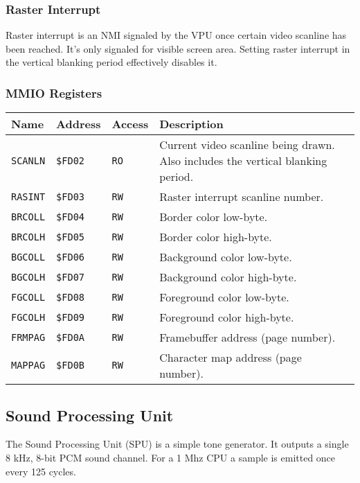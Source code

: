 \documentclass[a4paper,10pt,oneside]{article}
\begin{document}
\subsubsection*{Raster Interrupt}
Raster interrupt is an NMI signaled by the VPU once certain video scanline has been reached. It's only signaled for visible screen area. Setting raster interrupt in the vertical blanking period effectively disables it.

\subsubsection*{MMIO Registers}
\begin{tabularx}{\textwidth}{l | l | l | X }
  \textbf{Name} & \textbf{Address} & \textbf{Access} & \textbf{Description} \\ \hline
  \texttt{SCANLN} & \texttt{\$FD02} & \texttt{RO} &
  Current video scanline being drawn. Also includes the vertical blanking period. \\ \hline
  \texttt{RASINT} & \texttt{\$FD03} & \texttt{RW} &
  Raster interrupt scanline number. \\ \hline
  \texttt{BRCOLL} & \texttt{\$FD04} & \texttt{RW} &
  Border color low-byte. \\ \hline
  \texttt{BRCOLH} & \texttt{\$FD05} & \texttt{RW} &
  Border color high-byte. \\ \hline
  \texttt{BGCOLL} & \texttt{\$FD06} & \texttt{RW} &
  Background color low-byte. \\ \hline
  \texttt{BGCOLH} & \texttt{\$FD07} & \texttt{RW} &
  Background color high-byte. \\ \hline
  \texttt{FGCOLL} & \texttt{\$FD08} & \texttt{RW} &
  Foreground color low-byte. \\ \hline
  \texttt{FGCOLH} & \texttt{\$FD09} & \texttt{RW} &
  Foreground color high-byte. \\ \hline
  \texttt{FRMPAG} & \texttt{\$FD0A} & \texttt{RW} &
  Framebuffer address (page number). \\ \hline
  \texttt{MAPPAG} & \texttt{\$FD0B} & \texttt{RW} &
  Character map address (page number). \\
\end{tabularx}

\subsection{Sound Processing Unit}
The Sound Processing Unit (SPU) is a simple tone generator. It outputs a single 8 kHz, 8-bit PCM sound channel. For a 1 Mhz CPU a sample is emitted once every 125 cycles.
\end{document}
